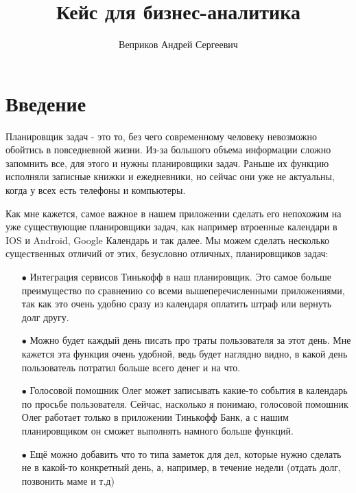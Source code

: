 \documentclass[a4paper,12pt]{article} %
\author{Веприков Андрей Сергеевич}
\title{Кейс для бизнес-аналитика}
\date{}
\begin{document}

\maketitle

\section*{Введение}

Планировщик задач - это то, без чего современному человеку невозможно обойтись в повседневной жизни. Из-за большого объема информации сложно запомнить все, для этого и нужны планировщики задач. Раньше их функцию исполняли записные книжки и ежедневники, но сейчас они уже не актуальны, когда у всех есть телефоны и компьютеры.

Как мне кажется, самое важное в нашем приложении сделать его непохожим на уже существующие планировщики задач, как например втроенные календари в IOS и Android, Google Календарь и так далее. Мы можем сделать несколько существенных отличий от этих, безусловно отличных, планировщиков задач:

\begin{enumerate}

\item[$\bullet$] Интеграция сервисов Тинькофф в наш планировщик. Это самое больше преимущество по сравнению со всеми вышеперечисленными приложениями, так как это очень удобно сразу из календаря оплатить штраф или вернуть долг другу.

\item[$\bullet$] Можно будет каждый день писать про траты пользователя за этот день. Мне кажется эта функция очень удобной, ведь будет наглядно видно, в какой день пользователь потратил больше всего денег и на что.

\item[$\bullet$] Голосовой помошник Олег может записывать какие-то события в календарь по просьбе пользователя. Сейчас, насколько я понимаю, голосовой помошник Олег работает только в приложении Тинькофф Банк, а с нашим планировщиком он сможет выполнять намного больше функций.

\item[$\bullet$] Ещё можно добавить что то типа заметок для дел, которые нужно сделать не в какой-то конкретный день, а, например, в течение недели (отдать долг, позвонить маме и т.д)

\end{enumerate}
\end{document}
